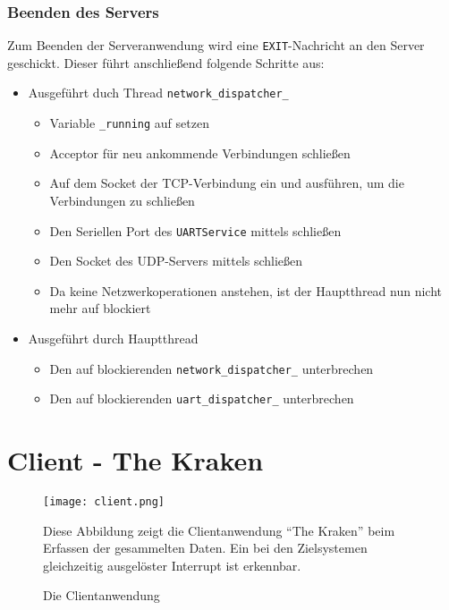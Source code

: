 \subsubsection*{Beenden des Servers}
Zum Beenden der Serveranwendung wird eine \texttt{EXIT}-Nachricht an den Server
geschickt.
Dieser führt anschließend folgende Schritte aus:
\begin{itemize}
  \item Ausgeführt duch Thread \texttt{network\_dispatcher\_}
  \begin{itemize}
  \item Variable \texttt{\_running} auf  setzen
  \item Acceptor für neu ankommende Verbindungen schließen
  \item Auf dem Socket der TCP-Verbindung ein 
  und  ausführen, um die Verbindungen zu schließen
  \item Den Seriellen Port des \texttt{UARTService} mittels
   schließen
  \item Den Socket des UDP-Servers mittels 
  schließen
  \item Da keine Netzwerkoperationen anstehen, ist der Hauptthread nun nicht
  mehr auf   blockiert
  \end{itemize}
  \item Ausgeführt durch Hauptthread
  \begin{itemize}
    \item Den auf  blockierenden
    \texttt{network\_dispatcher\_} unterbrechen
    \item Den auf  blockierenden
    \texttt{uart\_dispatcher\_} unterbrechen
  \end{itemize}
\end{itemize}
\section{Client - The Kraken}
\begin{figure}[!ht]
\centering
\texttt{[image: client.png]}
\caption{Die Clientanwendung}{Diese Abbildung zeigt die Clientanwendung
"`The Kraken"' beim Erfassen der gesammelten Daten. Ein bei den
Zielsystemen gleichzeitig ausgelöster Interrupt ist erkennbar.}
\label{fig:client}
\end{figure}
